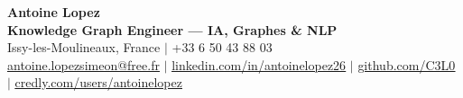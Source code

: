 \documentclass[letterpaper,10pt]{article}
\begin{document}
\begin{center}
    {\Huge \textbf{Antoine Lopez}} \\ \vspace{2pt}
    {\large \textbf{Knowledge Graph Engineer — IA, Graphes \& NLP}} \\ \vspace{3pt}
    \small
    Issy-les-Moulineaux, France $|$ +33 6 50 43 88 03 \\
    \href{mailto:antoine.lopezsimeon@free.fr}{\underline{antoine.lopezsimeon@free.fr}} $|$ 
    \href{https://linkedin.com/in/antoinelopez26}{\underline{linkedin.com/in/antoinelopez26}} $|$
    \href{https://github.com/C3L0}{\underline{github.com/C3L0}} $|$
    \href{https://www.credly.com/users/antoinelopez26}{\underline{credly.com/users/antoinelopez}}
\end{center}

\vspace{-10pt}







\end{document}
